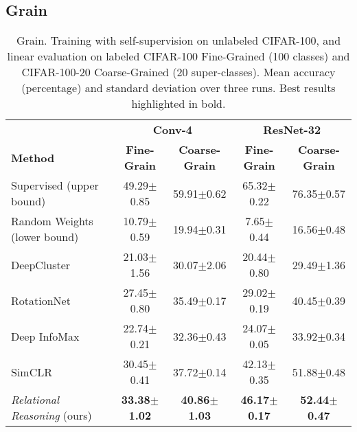 \documentclass{article}
\begin{document}
\subsection{Grain}\label{appendix:additional_grain}

\begin{table}[H]
 \caption{Grain. Training with self-supervision on unlabeled CIFAR-100, and linear evaluation on labeled CIFAR-100 Fine-Grained (100 classes) and CIFAR-100-20 Coarse-Grained (20 super-classes). Mean accuracy (percentage) and standard deviation over three runs. Best results highlighted in bold.}
 \label{tab:fine_coarse}
 \begin{adjustbox}{width=0.85\columnwidth,center}
  \centering
  \begin{tabular}{lcccc}
    \toprule
     & \multicolumn{2}{c}{\textbf{Conv-4}} & \multicolumn{2}{c}{\textbf{ResNet-32}} \\
    \cmidrule[0.1pt](r){2-3} \cmidrule[0.1pt](l){4-5}
    \textbf{Method} &
    \textbf{Fine-Grain} & \textbf{Coarse-Grain} &
    \textbf{Fine-Grain} & \textbf{Coarse-Grain} \\
    \midrule
    Supervised (upper bound) & 
    49.29$\pm$\small{0.85}  & 59.91$\pm$\small{0.62} &
    65.32$\pm$\small{0.22}  & 76.35$\pm$\small{0.57} \\
    Random Weights (lower bound) & 
    10.79$\pm$\small{0.59} & 19.94$\pm$\small{0.31} &
    7.65$\pm$\small{0.44}  & 16.56$\pm$\small{0.48} \\
    \cmidrule(l){1-5}
    DeepCluster \citep{caron2018deep} & 
    21.03$\pm$\small{1.56}  & 30.07$\pm$\small{2.06} &
    20.44$\pm$\small{0.80}  & 29.49$\pm$\small{1.36} \\
    RotationNet \citep{gidaris2018unsupervised} & 
    27.45$\pm$\small{0.80}  & 35.49$\pm$\small{0.17} &
    29.02$\pm$\small{0.19}  & 40.45$\pm$\small{0.39} \\
    Deep InfoMax \citep{hjelm2018learning} & 
    22.74$\pm$\small{0.21}  & 32.36$\pm$\small{0.43} &
    24.07$\pm$\small{0.05}  & 33.92$\pm$\small{0.34} \\
    SimCLR \citep{chen2020simple} & 
    30.45$\pm$\small{0.41}  & 37.72$\pm$\small{0.14} &
    42.13$\pm$\small{0.35}  & 51.88$\pm$\small{0.48} \\    
    \emph{Relational Reasoning} (ours) & 
    \textbf{33.38$\pm$\small{1.02}}  & \textbf{40.86$\pm$\small{1.03}} &
    \textbf{46.17$\pm$\small{0.17}}  & \textbf{52.44$\pm$\small{0.47}} \\
    \bottomrule
  \end{tabular}
 \end{adjustbox}
\end{table}
\end{document}
